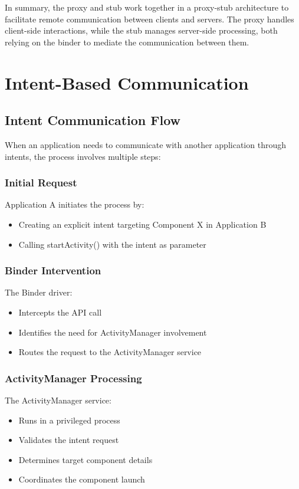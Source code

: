 \documentclass{article}
\begin{document}
In summary, the proxy and stub work together in a proxy-stub architecture to facilitate remote communication between clients and servers. The proxy handles client-side interactions, while the stub manages server-side processing, both relying on the binder to mediate the communication between them.


\section{Intent-Based Communication}
\subsection{Intent Communication Flow}
When an application needs to communicate with another application through intents, the process involves multiple steps:

\subsubsection{Initial Request}
Application A initiates the process by:
\begin{itemize}
    \item Creating an explicit intent targeting Component X in Application B
    \item Calling startActivity() with the intent as parameter
\end{itemize}

\subsubsection{Binder Intervention}
The Binder driver:
\begin{itemize}
    \item Intercepts the API call
    \item Identifies the need for ActivityManager involvement
    \item Routes the request to the ActivityManager service
\end{itemize}

\subsubsection{ActivityManager Processing}
The ActivityManager service:
\begin{itemize}
    \item Runs in a privileged process
    \item Validates the intent request
    \item Determines target component details
    \item Coordinates the component launch
\end{itemize}
\end{document}
